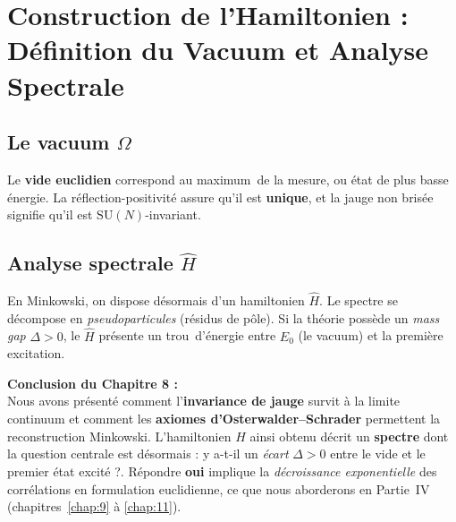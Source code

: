 \vspace{1em}

\section{Construction de l’Hamiltonien : Définition du Vacuum et Analyse Spectrale}
\label{sec:8.5}

\subsection*{Le vacuum \(\Omega\)}
Le \textbf{vide euclidien} correspond au \og maximum\fg\ de la mesure, ou état de plus basse énergie. La réflection-positivité assure qu’il est \textbf{unique}, et la jauge non brisée signifie qu’il est \(\mathrm{SU}(N)\)-invariant.

\subsection*{Analyse spectrale \(\widehat{H}\)}
En Minkowski, on dispose désormais d’un hamiltonien \(\widehat{H}\). Le spectre se décompose en \emph{pseudoparticules} (résidus de pôle). Si la théorie possède un \emph{mass gap} \(\Delta>0\), le \(\widehat{H}\) présente un \og trou\fg\ d’énergie entre \(E_0\) (le vacuum) et la première excitation.

\vspace{2em}

\noindent
\textbf{Conclusion du Chapitre 8 :}\\
Nous avons présenté comment l’\textbf{invariance de jauge} survit à la limite continuum et comment les \textbf{axiomes d’Osterwalder--Schrader} permettent la reconstruction Minkowski. L’hamiltonien \(\widehat{H}\) ainsi obtenu décrit un \textbf{spectre} dont la question centrale est désormais : \og y a-t-il un \emph{écart} \(\Delta>0\) entre le vide et le premier état excité ?\fg.  
Répondre \textbf{oui} implique la \emph{décroissance exponentielle} des corrélations en formulation euclidienne, ce que nous aborderons en Partie~IV (chapitres~\ref{chap:9} à \ref{chap:11}).

